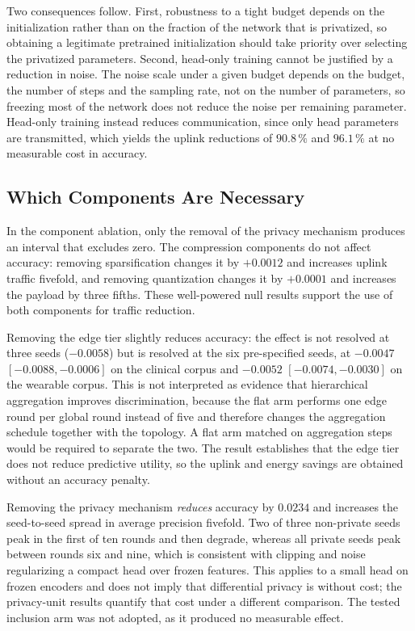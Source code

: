 Two consequences follow. First, robustness to a tight budget depends on the
initialization rather than on the fraction of the network that is privatized,
so obtaining a legitimate pretrained initialization should take priority over
selecting the privatized parameters. Second, head-only training cannot be
justified by a reduction in noise. The noise scale under a given budget depends
on the budget, the number of steps and the sampling rate, not on the number of
parameters, so freezing most of the network does not reduce the noise per
remaining parameter. Head-only training instead reduces communication, since
only head parameters are transmitted, which yields the uplink reductions of
$90.8\,\%$ and $96.1\,\%$ at no measurable cost in accuracy.

\subsection{Which Components Are Necessary}
\label{sec:discussion:components}

In the component ablation, only the removal of the privacy mechanism produces
an interval that excludes zero. The compression components do not affect
accuracy: removing sparsification changes it by $+0.0012$ and increases uplink
traffic fivefold, and removing quantization changes it by $+0.0001$ and
increases the payload by three fifths. These well-powered null results support
the use of both components for traffic reduction.

Removing the edge tier slightly reduces accuracy: the effect is not resolved at
three seeds ($-0.0058$) but is resolved at the six pre-specified seeds, at
$-0.0047$ $[-0.0088, -0.0006]$ on the clinical corpus and $-0.0052$
$[-0.0074, -0.0030]$ on the wearable corpus. This is not interpreted as
evidence that hierarchical aggregation improves discrimination, because the
flat arm performs one edge round per global round instead of five and therefore
changes the aggregation schedule together with the topology. A flat arm matched
on aggregation steps would be required to separate the two. The result
establishes that the edge tier does not reduce predictive utility, so the
uplink and energy savings are obtained without an accuracy penalty.

Removing the privacy mechanism \emph{reduces} accuracy by $0.0234$ and
increases the seed-to-seed spread in average precision fivefold. Two of three
non-private seeds peak in the first of ten rounds and then degrade, whereas all
private seeds peak between rounds six and nine, which is consistent with
clipping and noise regularizing a compact head over frozen features. This applies to a
small head on frozen encoders and does not imply that differential privacy is
without cost; the privacy-unit results quantify that cost under a different
comparison. The tested inclusion arm was not adopted, as it produced no
measurable effect.

